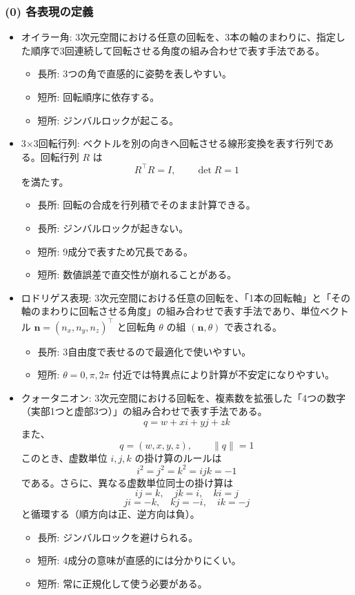 ﻿\documentclass[11pt,a4paper]{ltjsarticle}
\begin{document}
\subsubsection*{(0) 各表現の定義}
\begin{itemize}
  \item オイラー角: 3次元空間における任意の回転を、3本の軸のまわりに、指定した順序で3回連続して回転させる角度の組み合わせで表す手法である。
  \begin{itemize}
    \item 長所: 3つの角で直感的に姿勢を表しやすい。
    \item 短所: 回転順序に依存する。
    \item 短所: ジンバルロックが起こる。
  \end{itemize}
  \item 3×3回転行列: ベクトルを別の向きへ回転させる線形変換を表す行列である。回転行列 $R$ は
  \[
  R^\top R=I,\qquad \det R=1
  \]
  を満たす。
  \begin{itemize}
    \item 長所: 回転の合成を行列積でそのまま計算できる。
    \item 長所: ジンバルロックが起きない。
    \item 短所: 9成分で表すため冗長である。
    \item 短所: 数値誤差で直交性が崩れることがある。
  \end{itemize}
  \item ロドリゲス表現: 3次元空間における任意の回転を、「1本の回転軸」と「その軸のまわりに回転させる角度」の組み合わせで表す手法であり、単位ベクトル $\mathbf{n}=(n_x,n_y,n_z)^\top$ と回転角 $\theta$ の組 $(\mathbf{n},\theta)$ で表される。
  \begin{itemize}
    \item 長所: 3自由度で表せるので最適化で使いやすい。
    \item 短所: $\theta=0,\pi,2\pi$ 付近では特異点により計算が不安定になりやすい。
  \end{itemize}
  \item クォータニオン: 3次元空間における回転を、複素数を拡張した「4つの数字（実部1つと虚部3つ）」の組み合わせで表す手法である。
  \[
  q = w + xi + yj + zk
  \]
  また、
  \[
  q=(w,x,y,z),\qquad \|q\|=1
  \]
  このとき、虚数単位 $i,j,k$ の掛け算のルールは
  \[
  i^2=j^2=k^2=ijk=-1
  \]
  である。さらに、異なる虚数単位同士の掛け算は
  \[
  ij=k,\quad jk=i,\quad ki=j
  \]
  \[
  ji=-k,\quad kj=-i,\quad ik=-j
  \]
  と循環する（順方向は正、逆方向は負）。
  \begin{itemize}
    \item 長所: ジンバルロックを避けられる。
    \item 短所: 4成分の意味が直感的には分かりにくい。
    \item 短所: 常に正規化して使う必要がある。
  \end{itemize}
\end{itemize}
\end{document}
